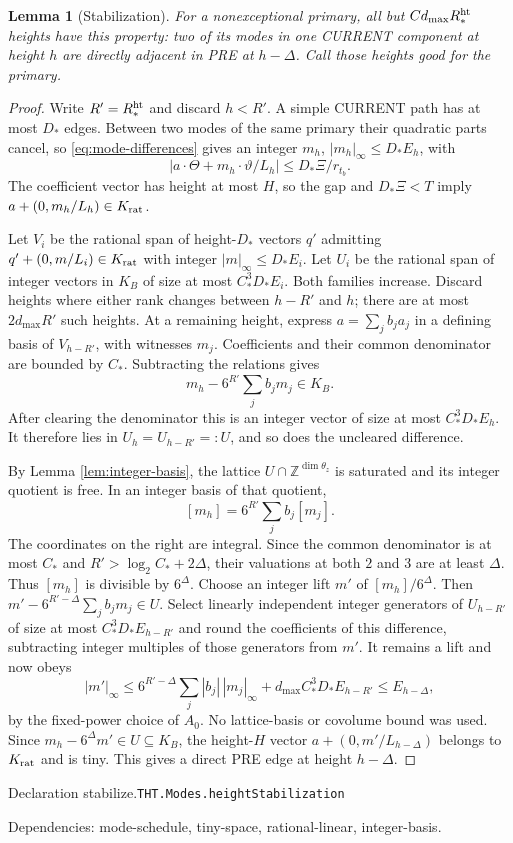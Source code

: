 \documentclass[11pt]{article}
\newtheorem{lemma}[theorem]{Lemma}
\theoremstyle{definition}
\newcommand{\Z}{\mathbb Z}
\numberwithin{equation}{section}
\newcommand{\bp}[3]{\par\smallskip\begingroup\footnotesize
\noindent\hypertarget{bp:#1}{\textsf{Declaration #1.}}\quad\nolinkurl{#2}\par
\noindent\textsf{Dependencies:} #3.\par\endgroup\smallskip}
\begin{document}
\begin{lemma}[Stabilization]\label{lem:stabilize}
For a nonexceptional primary, all but $Cd_{\max}R_*^{\rm ht}$ heights have this property: two of its modes in one CURRENT component at height $h$ are directly adjacent in PRE at $h-\Delta$. Call those heights good for the primary.
\end{lemma}
\begin{proof}
Write $R'=R_*^{\rm ht}$ and discard $h<R'$. A simple CURRENT path has at most $D_*$ edges. Between two modes of the same primary their quadratic parts cancel, so \eqref{eq:mode-differences} gives an integer $m_h$, $|m_h|_\infty\le D_*E_h$, with
\[
 |a\cdot\Theta+m_h\cdot\vartheta/L_h|\le D_*\Xi/r_{t_b}.
\]
The coefficient vector has height at most $H$, so the gap and $D_*\Xi<T$ imply $a+(0,m_h/L_h)\in K_{\rm rat}$.

Let $V_i$ be the rational span of height-$D_*$ vectors $q'$ admitting $q'+(0,m/L_i)\in K_{\rm rat}$ with integer $|m|_\infty\le D_*E_i$. Let $U_i$ be the rational span of integer vectors in $K_B$ of size at most $C_*^3D_*E_i$. Both families increase. Discard heights where either rank changes between $h-R'$ and $h$; there are at most $2d_{\max}R'$ such heights. At a remaining height, express $a=\sum_jb_ja_j$ in a defining basis of $V_{h-R'}$, with witnesses $m_j$. Coefficients and their common denominator are bounded by $C_*$. Subtracting the relations gives
\[
 m_h-6^{R'}\sum_jb_jm_j\in K_B.
\]
After clearing the denominator this is an integer vector of size at most $C_*^3D_*E_h$. It therefore lies in $U_h=U_{h-R'}=:U$, and so does the uncleared difference.

By Lemma \ref{lem:integer-basis}, the lattice $U\cap\Z^{\dim\theta_z}$ is saturated and its integer quotient is free. In an integer basis of that quotient,
\[
 [m_h]=6^{R'}\sum_jb_j[m_j].
\]
The coordinates on the right are integral. Since the common denominator is at most $C_*$ and $R'>\log_2C_*+2\Delta$, their valuations at both $2$ and $3$ are at least $\Delta$. Thus $[m_h]$ is divisible by $6^\Delta$. Choose an integer lift $m'$ of $[m_h]/6^\Delta$. Then $m'-6^{R'-\Delta}\sum_jb_jm_j\in U$. Select linearly independent integer generators of $U_{h-R'}$ of size at most $C_*^3D_*E_{h-R'}$ and round the coefficients of this difference, subtracting integer multiples of those generators from $m'$. It remains a lift and now obeys
\[
 |m'|_\infty\le6^{R'-\Delta}\sum_j|b_j|\,|m_j|_\infty
 +d_{\max}C_*^3D_*E_{h-R'}\le E_{h-\Delta},
\]
by the fixed-power choice of $A_0$. No lattice-basis or covolume bound was used. Since $m_h-6^\Delta m'\in U\subseteq K_B$, the height-$H$ vector $a+(0,m'/L_{h-\Delta})$ belongs to $K_{\rm rat}$ and is tiny. This gives a direct PRE edge at height $h-\Delta$.
\end{proof}
\bp{stabilize}{THT.Modes.heightStabilization}{mode-schedule, tiny-space, rational-linear, integer-basis}
\end{document}
